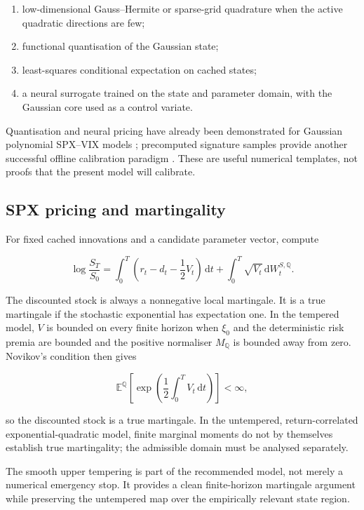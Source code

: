 \documentclass[11pt,a4paper]{article}
\newcommand{\Qq}{\mathbb{Q}}
\newcommand{\E}{\mathbb{E}}
\newcommand{\dd}{\,\mathrm{d}}
\begin{document}
\begin{enumerate}
  \item low-dimensional Gauss--Hermite or sparse-grid quadrature when the active quadratic
  directions are few;
  \item functional quantisation of the Gaussian state;
  \item least-squares conditional expectation on cached states;
  \item a neural surrogate trained on the state and parameter domain, with the Gaussian core
  used as a control variate.
\end{enumerate}

Quantisation and neural pricing have already been demonstrated for Gaussian polynomial
SPX--VIX models \cite{abijaber2024}; precomputed signature samples provide another successful
offline calibration paradigm \cite{cuchiero2024}. These are useful numerical templates, not
proofs that the present model will calibrate.

\subsection{SPX pricing and martingality}

For fixed cached innovations and a candidate parameter vector, compute

\begin{equation}
\log\frac{S_T}{S_0}
=\int_0^T\left(r_t-d_t-\frac12V_t\right)\dd t
+\int_0^T\sqrt{V_t}\dd W_t^{S,\Qq}.
\end{equation}

The discounted stock is always a nonnegative local martingale. It is a true martingale if the
stochastic exponential has expectation one. In the tempered model, \(V\) is bounded on every
finite horizon when \(\xi_0\) and the deterministic risk premia are bounded and the positive
normaliser \(M_{\Qq}\) is bounded away from zero. Novikov's condition then gives

\begin{equation}
\E^{\Qq}\!\left[
\exp\!\left(\frac12\int_0^T V_t\dd t\right)
\right]<\infty,
\end{equation}

so the discounted stock is a true martingale. In the untempered, return-correlated
exponential-quadratic model, finite marginal moments do not by themselves establish true
martingality; the admissible domain must be analysed separately.

\begin{resultbox}
The smooth upper tempering is part of the recommended model, not merely a numerical emergency
stop. It provides a clean finite-horizon martingale argument while preserving the untempered
map over the empirically relevant state region.
\end{resultbox}
\end{document}
